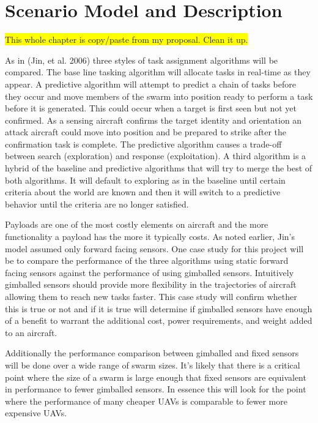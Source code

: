 \chapter{Scenario Model and Description}

\colorbox{yellow}{This whole chapter is copy/paste from my proposal.  Clean it up.}


As in (Jin, et al. 2006) three styles of task assignment algorithms will be compared.  The base line tasking algorithm will allocate tasks in real-time as they appear.   A predictive algorithm will attempt to predict a chain of tasks before they occur and move members of the swarm into position ready to perform a task before it is generated.  This could occur when a target is first seen but not yet confirmed.   As a sensing aircraft confirms the target identity and orientation an attack aircraft could move into position and be prepared to strike after the confirmation task is complete.  The predictive algorithm causes a trade-off between search (exploration) and response (exploitation).  A third algorithm is a hybrid of the baseline and predictive algorithms that will try to merge the best of both algorithms.  It will default to exploring as in the baseline until certain criteria about the world are known and then it will switch to a predictive behavior until the criteria are no longer satisfied.

Payloads are one of the most costly elements on aircraft and the more functionality a payload has the more it typically costs.  As noted earlier, Jin’s model assumed only forward facing sensors.  One case study for this project will be to compare the performance of the three algorithms using static forward facing sensors against the performance of using gimballed sensors.  Intuitively gimballed sensors should provide more flexibility in the trajectories of aircraft allowing them to reach new tasks faster.  This case study will confirm whether this is true or not and if it is true will determine if gimballed sensors have enough of a benefit to warrant the additional cost, power requirements, and weight added to an aircraft.  

Additionally the performance comparison between gimballed and fixed sensors will be done over a wide range of swarm sizes.  It’s likely that there is a critical point where the size of a swarm is large enough that fixed sensors are equivalent in performance to fewer gimballed sensors.  In essence this will look for the point where the performance of many cheaper UAVs is comparable to fewer more expensive UAVs.

